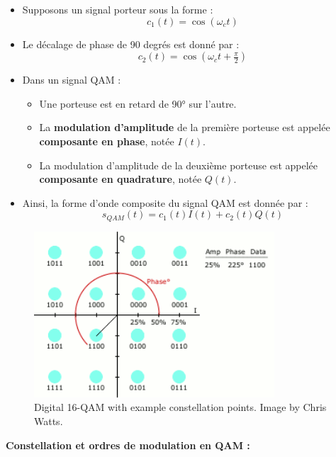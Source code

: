 \begin{itemize}
    \item Supposons un signal porteur sous la forme :
    \[
    c_1(t) = \cos(\omega_c t)
    \]
    \item Le décalage de phase de 90 degrés est donné par :
    \[
    c_2(t) = \cos(\omega_c t + \tfrac{\pi}{2})
    \]
    \item Dans un signal QAM :
    \begin{itemize}
        \item Une porteuse est en retard de 90° sur l'autre.
        \item La \textbf{modulation d'amplitude} de la première porteuse est appelée \textbf{composante en phase}, notée \( I(t) \).
        \item La modulation d'amplitude de la deuxième porteuse est appelée \textbf{composante en quadrature}, notée \( Q(t) \).
    \end{itemize}
    \item Ainsi, la forme d'onde composite du signal QAM est donnée par :
    \[
    s_{QAM}(t) = c_1(t) I(t) + c_2(t) Q(t)
    \]
\end{itemize}
\begin{figure}[H] %
    \centering
    \includegraphics[width=0.8\textwidth]{figures/QAM16_Demonstration.png}
    \caption{Digital 16-QAM with example constellation points. Image by Chris Watts.}
    \label{fig:communication2}
\end{figure}
\textbf{Constellation et ordres de modulation en QAM :}
